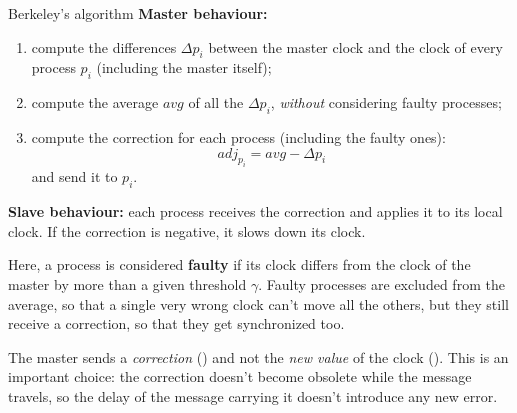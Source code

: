 \begin{framedalgo}[label={alg:berkeley}, unbreakable]{Berkeley's algorithm}
  \textbf{Master behaviour:}
  \begin{enumerate}
    \item compute the differences $\Delta p_i$ between the master clock and the clock of every process $p_i$ (including the master itself);
    \item compute the average $\textit{avg}$ of all the $\Delta p_i$, \textit{without} considering faulty processes;
    \item compute the correction for each process (including the faulty ones):
    \[\textit{adj}_{p_i} = \textit{avg} - \Delta p_i\]
    and send it to $p_i$.
  \end{enumerate}
  \textbf{Slave behaviour:} each process receives the correction and applies it to its local clock. If the correction is negative, it slows down its clock.
\end{framedalgo}

Here, a process is considered \textbf{faulty} if its clock differs from the clock of the master by more than a given threshold $\gamma$. Faulty processes are excluded from the average, so that a single very wrong clock can't move all the others, but they still receive a correction, so that they get synchronized too.

\begin{framedobs}{}
  The master sends a \textit{correction} () and not the \textit{new value} of the clock (). This is an important choice: the correction doesn't become obsolete while the message travels, so the delay of the message carrying it doesn't introduce any new error.
\end{framedobs}

